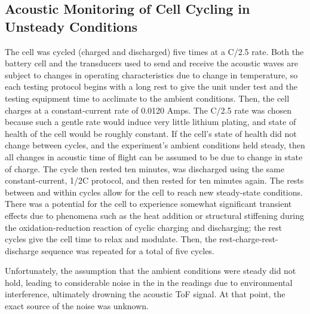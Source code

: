 \subsection{Acoustic Monitoring of Cell Cycling in Unsteady Conditions}

The cell was cycled (charged and discharged) five times at a C/2.5 rate. 
Both the battery cell and the transducers used to send and receive the acoustic waves are subject to changes in operating characteristics due to change in temperature, so each testing protocol begins with a long rest to give the unit under test and the testing equipment time to acclimate to the ambient conditions. 
Then, the cell charges at a constant-current rate of 0.0120 Amps. 
The C/2.5 rate was chosen because such a gentle rate would induce very little lithium plating, and state of health of the cell would be roughly constant. 
If the cell's state of health did not change between cycles, and the experiment's ambient conditions held steady, then all changes in acoustic time of flight can be assumed to be due to change in state of charge.
The cycle then rested ten minutes, was discharged using the same constant-current, 1/2C protocol, and then rested for ten minutes again. 
The rests between and within cycles allow for the cell to reach new steady-state conditions. 
There was a potential for the cell to experience somewhat significant transient effects due to phenomena such as the heat addition or structural stiffening during the oxidation-reduction reaction of cyclic charging and discharging; the rest cycles give the cell time to relax and modulate.
Then, the rest-charge-rest-discharge sequence was repeated for a total of five cycles.


Unfortunately, the assumption that the ambient conditions were steady did not hold, leading to considerable noise in the in the readings due to environmental interference, ultimately drowning the acoustic ToF signal. At that point, the exact source of the noise was unknown.

    
